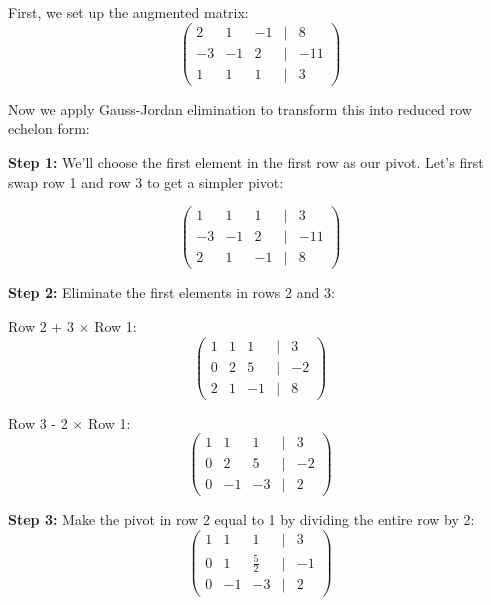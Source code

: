 First, we set up the augmented matrix:
\begin{equation*}
\begin{pmatrix}
2 & 1 & -1 & | & 8 \\
-3 & -1 & 2 & | & -11 \\
1 & 1 & 1 & | & 3
\end{pmatrix}
\end{equation*}

Now we apply Gauss-Jordan elimination to transform this into reduced row echelon form:
\vspace{\baselineskip}

\textbf{Step 1:} We'll choose the first element in the first row as our pivot. Let's first swap row 1 and row 3 to get a simpler pivot:

\begin{equation*}
\begin{pmatrix}
1 & 1 & 1 & | & 3 \\
-3 & -1 & 2 & | & -11 \\
2 & 1 & -1 & | & 8
\end{pmatrix}
\end{equation*}

\textbf{Step 2:} Eliminate the first elements in rows 2 and 3:

Row 2 + 3 \(\times\) Row 1:
\begin{equation*}
\begin{pmatrix}
1 & 1 & 1 & | & 3 \\
0 & 2 & 5 & | & -2 \\
2 & 1 & -1 & | & 8
\end{pmatrix}
\end{equation*}

Row 3 - 2 \(\times\) Row 1:
\begin{equation*}
\begin{pmatrix}
1 & 1 & 1 & | & 3 \\
0 & 2 & 5 & | & -2 \\
0 & -1 & -3 & | & 2
\end{pmatrix}
\end{equation*}

\textbf{Step 3:} Make the pivot in row 2 equal to 1 by dividing the entire row by 2:
\begin{equation*}
\begin{pmatrix}
1 & 1 & 1 & | & 3 \\
0 & 1 & \frac{5}{2} & | & -1 \\
0 & -1 & -3 & | & 2
\end{pmatrix}
\end{equation*}

